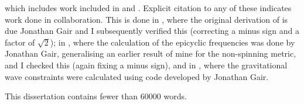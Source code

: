 which includes work included in  and . Explicit citation to any of these indicates work done in collaboration. This is done in , where the original derivation of  is due Jonathan Gair and I subsequently verified this (correcting a minus sign and a factor of $\sqrt{2}$); in , where the calculation of the epicyclic frequencies was done by Jonathan Gair, generalising an earlier result of mine for the non-spinning metric, and I checked this (again fixing a minus sign), and in , where the gravitational wave constraints were calculated using code developed by Jonathan Gair.

This dissertation contains fewer than $60000$ words.

